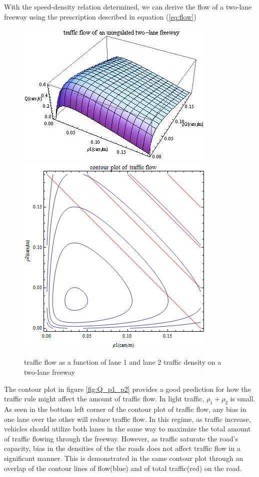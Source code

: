 	With the speed-density relation determined, we can derive the flow of a two-lane freeway using the prescription described in equation (\ref{eq:flow})
	\begin{figure}[h]
	\includegraphics[scale=.6]{plot/unregulated_flow}
	\includegraphics[scale=.45]{plot/contour_flow}
	\caption{traffic flow as a function of lane 1 and lane 2 traffic density on a two-lane freeway}
	\end{figure}
	
	The contour plot in figure \ref{fig:Q_p1_p2} provides a good prediction for how the traffic rule might affect the amount of traffic flow. 
	In light traffic, $\rho_1+\rho_2$ is small. As seen in the bottom left corner of the contour plot of traffic flow, any bias in one lane over the other will reduce traffic flow. In this regime, as traffic increase, vehicles should utilize both lanes in the same way to maximize the total amount of traffic flowing through the freeway. However, as traffic saturate the road's capacity, bias in the densities of the the roads does not affect traffic flow in a significant manner. This is demonstrated in the same contour plot through an overlap of the contour lines of flow(blue) and of total traffic(red) on the road.
	